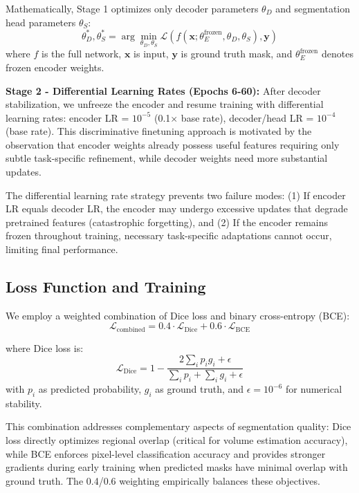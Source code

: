\documentclass{article}
\begin{document}
Mathematically, Stage 1 optimizes only decoder parameters $\theta_D$ and segmentation head parameters $\theta_S$:
\begin{equation}
\theta_D^*, \theta_S^* = \arg\min_{\theta_D, \theta_S} \mathcal{L}(f(\mathbf{x}; \theta_E^{\text{frozen}}, \theta_D, \theta_S), \mathbf{y})
\end{equation}
where $f$ is the full network, $\mathbf{x}$ is input, $\mathbf{y}$ is ground truth mask, and $\theta_E^{\text{frozen}}$ denotes frozen encoder weights.

\textbf{Stage 2 - Differential Learning Rates (Epochs 6-60):}
After decoder stabilization, we unfreeze the encoder and resume training with differential learning rates: encoder LR = $10^{-5}$ (0.1$\times$ base rate), decoder/head LR = $10^{-4}$ (base rate). This discriminative finetuning approach \cite{ref10} is motivated by the observation that encoder weights already possess useful features requiring only subtle task-specific refinement, while decoder weights need more substantial updates.

The differential learning rate strategy prevents two failure modes: (1) If encoder LR equals decoder LR, the encoder may undergo excessive updates that degrade pretrained features (catastrophic forgetting), and (2) If the encoder remains frozen throughout training, necessary task-specific adaptations cannot occur, limiting final performance.

\subsection{Loss Function and Training}

We employ a weighted combination of Dice loss and binary cross-entropy (BCE):
\begin{equation}
\mathcal{L}_{\text{combined}} = 0.4 \cdot \mathcal{L}_{\text{Dice}} + 0.6 \cdot \mathcal{L}_{\text{BCE}}
\end{equation}

where Dice loss is:
\begin{equation}
\mathcal{L}_{\text{Dice}} = 1 - \frac{2 \sum_i p_i g_i + \epsilon}{\sum_i p_i + \sum_i g_i + \epsilon}
\end{equation}
with $p_i$ as predicted probability, $g_i$ as ground truth, and $\epsilon=10^{-6}$ for numerical stability.

This combination addresses complementary aspects of segmentation quality: Dice loss directly optimizes regional overlap (critical for volume estimation accuracy), while BCE enforces pixel-level classification accuracy and provides stronger gradients during early training when predicted masks have minimal overlap with ground truth. The 0.4/0.6 weighting empirically balances these objectives.
\end{document}
